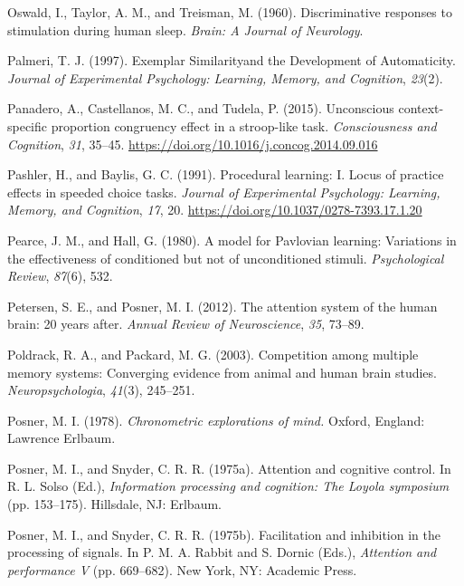 \documentclass[]{DissertateCUNY}
\begin{document}
\leavevmode\hypertarget{ref-oswald_discriminative_1960}{}%
Oswald, I., Taylor, A. M., and Treisman, M. (1960). Discriminative
responses to stimulation during human sleep. \emph{Brain: A Journal of
Neurology}.

\leavevmode\hypertarget{ref-palmeri_exemplar_1997}{}%
Palmeri, T. J. (1997). Exemplar Similarityand the Development of
Automaticity. \emph{Journal of Experimental Psychology: Learning,
Memory, and Cognition}, \emph{23}(2).

\leavevmode\hypertarget{ref-panadero_unconscious_2015}{}%
Panadero, A., Castellanos, M. C., and Tudela, P. (2015). Unconscious
context-specific proportion congruency effect in a stroop-like task.
\emph{Consciousness and Cognition}, \emph{31}, 35--45.
\url{https://doi.org/10.1016/j.concog.2014.09.016}

\leavevmode\hypertarget{ref-pashler_procedural_1991}{}%
Pashler, H., and Baylis, G. C. (1991). Procedural learning: I. Locus of
practice effects in speeded choice tasks. \emph{Journal of Experimental
Psychology: Learning, Memory, and Cognition}, \emph{17}, 20.
\url{https://doi.org/10.1037/0278-7393.17.1.20}

\leavevmode\hypertarget{ref-pearce_model_1980}{}%
Pearce, J. M., and Hall, G. (1980). A model for Pavlovian learning:
Variations in the effectiveness of conditioned but not of unconditioned
stimuli. \emph{Psychological Review}, \emph{87}(6), 532.

\leavevmode\hypertarget{ref-petersen_attention_2012}{}%
Petersen, S. E., and Posner, M. I. (2012). The attention system of the
human brain: 20 years after. \emph{Annual Review of Neuroscience},
\emph{35}, 73--89.

\leavevmode\hypertarget{ref-poldrack_competition_2003}{}%
Poldrack, R. A., and Packard, M. G. (2003). Competition among multiple
memory systems: Converging evidence from animal and human brain studies.
\emph{Neuropsychologia}, \emph{41}(3), 245--251.

\leavevmode\hypertarget{ref-posner_chronometric_1978}{}%
Posner, M. I. (1978). \emph{Chronometric explorations of mind.} Oxford,
England: Lawrence Erlbaum.

\leavevmode\hypertarget{ref-posner_attention_1975}{}%
Posner, M. I., and Snyder, C. R. R. (1975a). Attention and cognitive
control. In R. L. Solso (Ed.), \emph{Information processing and
cognition: The Loyola symposium} (pp. 153--175). Hillsdale, NJ: Erlbaum.

\leavevmode\hypertarget{ref-posner_facilitation_1975}{}%
Posner, M. I., and Snyder, C. R. R. (1975b). Facilitation and inhibition
in the processing of signals. In P. M. A. Rabbit and S. Dornic (Eds.),
\emph{Attention and performance V} (pp. 669--682). New York, NY:
Academic Press.
\end{document}
